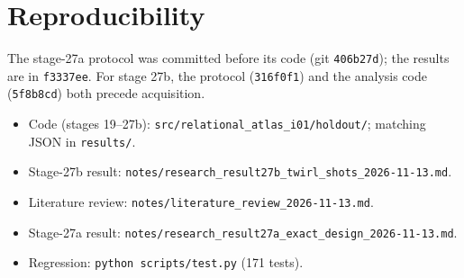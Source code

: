 \documentclass[11pt,a4paper]{article}
\begin{document}
\section*{Reproducibility}
The stage-27a protocol was committed before its code (git \texttt{406b27d}); the results are in \texttt{f3337ee}. For stage 27b, the protocol (\texttt{316f0f1}) and the analysis code (\texttt{5f8b8cd}) both precede acquisition.
\begin{itemize}\itemsep0pt
\item Code (stages 19--27b): \texttt{src/relational\_atlas\_i01/holdout/}; matching JSON in \texttt{results/}.
\item Stage-27b result: \texttt{notes/research\_result27b\_twirl\_shots\_2026-11-13.md}.
\item Literature review: \texttt{notes/literature\_review\_2026-11-13.md}.
\item Stage-27a result: \texttt{notes/research\_result27a\_exact\_design\_2026-11-13.md}.
\item Regression: \texttt{python scripts/test.py} (171 tests).
\end{itemize}
\end{document}
